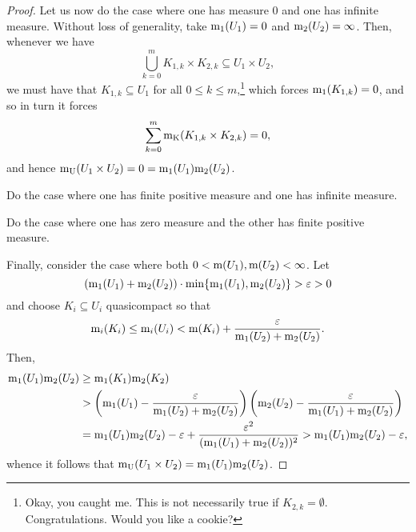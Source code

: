 \begin{thm}
\begin{proof}
Let us now do the case where one has measure $0$ and one has infinite measure.  Without loss of generality, take $\mathrm{m} _1(U_1)=0$ and $\mathrm{m} _2(U_2)=\infty$.  Then, whenever we have
\begin{equation}
\bigcup _{k=0}^mK_{1,k}\times K_{2,k}\subseteq U_1\times U_2,
\end{equation}
we must have that $K_{1,k}\subseteq U_1$ for all $0\leq k\leq m$,\footnote{Okay, you caught me.  This is not necessarily true if $K_{2,k}=\emptyset$.  Congratulations.  Would you like a cookie?} which forces $\mathrm{m} _1(K_{1,k})=0$, and so in turn it forces
\begin{equation}
\sum _{k=0}^m\mathrm{m} _{\mathrm{K}}(K_{1,k}\times K_{2,k})=0,
\end{equation}
and hence $\mathrm{m} _{\mathrm{U}}(U_1\times U_2)=0=\mathrm{m} _1(U_1)\mathrm{m} _2(U_2)$.

\begin{exr}
Do the case where one has finite positive measure and one has infinite measure.
\end{exr}

\begin{exr}
Do the case where one has zero measure and the other has finite positive measure.
\end{exr}

Finally, consider the case where both $0<\mathrm{m} (U_1),\mathrm{m} (U_2)<\infty$.  Let
\begin{equation}
(\mathrm{m} _1(U_1)+\mathrm{m} _2(U_2))\cdot \min \{ \mathrm{m} _1(U_1),\mathrm{m} _2(U_2)\} >\varepsilon >0
\end{equation}
and choose $K_i\subseteq U_i$ quasicompact so that
\begin{equation}
\mathrm{m} _i(K_i)\leq \mathrm{m} _i(U_i)<\mathrm{m} (K_i)+\frac{\varepsilon}{\mathrm{m} _1(U_2)+\mathrm{m} _2(U_2)}.
\end{equation}
Then,
\begin{equation}
\begin{split}
\mathrm{m} _1(U_1)\mathrm{m} _2(U_2) & \geq \mathrm{m} _1(K_1)\mathrm{m} _2(K_2) \\
& >\left( \mathrm{m} _1(U_1)-\frac{\varepsilon}{\mathrm{m} _1(U_2)+\mathrm{m} _2(U_2)}\right) \left( \mathrm{m} _2(U_2)-\frac{\varepsilon}{\mathrm{m} _1(U_1)+\mathrm{m} _2(U_2)}\right) \\
& =\mathrm{m} _1(U_1)\mathrm{m} _2(U_2)-\varepsilon +\frac{\varepsilon ^2}{(\mathrm{m} _1(U_1)+\mathrm{m} _2(U_2))^2}>\mathrm{m} _1(U_1)\mathrm{m} _2(U_2)-\varepsilon ,
\end{split}
\end{equation}
whence it follows that $\mathrm{m} _{\mathrm{U}}(U_1\times U_2)=\mathrm{m} _1(U_1)\mathrm{m} _2(U_2)$.


\end{proof}
\end{thm}
